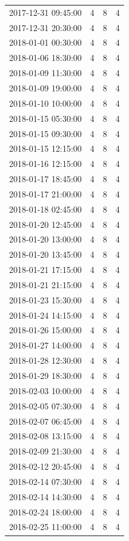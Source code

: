 \begin{tabular}{lrrr}
2017-12-31 09:45:00 & 4 & 8 & 4 \\
2017-12-31 20:30:00 & 4 & 8 & 4 \\
2018-01-01 00:30:00 & 4 & 8 & 4 \\
2018-01-06 18:30:00 & 4 & 8 & 4 \\
2018-01-09 11:30:00 & 4 & 8 & 4 \\
2018-01-09 19:00:00 & 4 & 8 & 4 \\
2018-01-10 10:00:00 & 4 & 8 & 4 \\
2018-01-15 05:30:00 & 4 & 8 & 4 \\
2018-01-15 09:30:00 & 4 & 8 & 4 \\
2018-01-15 12:15:00 & 4 & 8 & 4 \\
2018-01-16 12:15:00 & 4 & 8 & 4 \\
2018-01-17 18:45:00 & 4 & 8 & 4 \\
2018-01-17 21:00:00 & 4 & 8 & 4 \\
2018-01-18 02:45:00 & 4 & 8 & 4 \\
2018-01-20 12:45:00 & 4 & 8 & 4 \\
2018-01-20 13:00:00 & 4 & 8 & 4 \\
2018-01-20 13:45:00 & 4 & 8 & 4 \\
2018-01-21 17:15:00 & 4 & 8 & 4 \\
2018-01-21 21:15:00 & 4 & 8 & 4 \\
2018-01-23 15:30:00 & 4 & 8 & 4 \\
2018-01-24 14:15:00 & 4 & 8 & 4 \\
2018-01-26 15:00:00 & 4 & 8 & 4 \\
2018-01-27 14:00:00 & 4 & 8 & 4 \\
2018-01-28 12:30:00 & 4 & 8 & 4 \\
2018-01-29 18:30:00 & 4 & 8 & 4 \\
2018-02-03 10:00:00 & 4 & 8 & 4 \\
2018-02-05 07:30:00 & 4 & 8 & 4 \\
2018-02-07 06:45:00 & 4 & 8 & 4 \\
2018-02-08 13:15:00 & 4 & 8 & 4 \\
2018-02-09 21:30:00 & 4 & 8 & 4 \\
2018-02-12 20:45:00 & 4 & 8 & 4 \\
2018-02-14 07:30:00 & 4 & 8 & 4 \\
2018-02-14 14:30:00 & 4 & 8 & 4 \\
2018-02-24 18:00:00 & 4 & 8 & 4 \\
2018-02-25 11:00:00 & 4 & 8 & 4 \\

\end{tabular}
